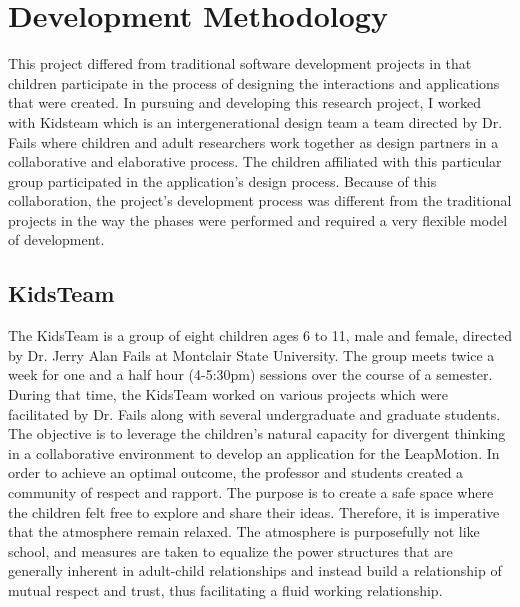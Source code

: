 
\chapter{Development Methodology} %

\label{Chapter2} %



This project differed from traditional software development projects in that children participate in the process of designing the interactions and applications that were created. In pursuing and developing this research project, I worked with Kidsteam which is an intergenerational design team a team directed by Dr. Fails where children and adult researchers work together as design partners in a collaborative and elaborative process. The children affiliated with this particular group participated in the application's design process. Because of this collaboration, the project's development process was different from the traditional projects in the way the phases were performed and required a very flexible model of development. 

\section{KidsTeam}
The KidsTeam is a group of eight children ages 6 to 11, male and female, directed by Dr. Jerry Alan Fails at Montclair State University. The group meets twice a week for one and a half hour (4-5:30pm) sessions over the course of a semester. During that time, the KidsTeam worked on various projects which were facilitated by Dr. Fails along with several undergraduate and graduate students. The objective is to leverage the children's natural capacity for divergent thinking in a collaborative environment to develop an application for the LeapMotion. In order to achieve an optimal outcome, the professor and students created a community of respect and rapport. The purpose is to create a safe space where the children felt free to explore and share their ideas. Therefore, it is imperative that the atmosphere remain relaxed. The atmosphere is purposefully not like school, and measures are taken to equalize the power structures that are generally inherent in adult-child relationships and instead build a relationship of mutual respect and trust, thus facilitating a fluid working relationship.

